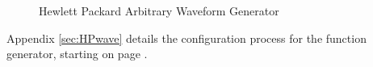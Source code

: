 \begin{figure}
    \caption{Hewlett Packard Arbitrary Waveform Generator}
    \label{fig:HPwave}
\end{figure}

Appendix \ref{sec:HPwave}  details the configuration process  for the function
generator, starting on page \pageref{sec:HPwave}.
